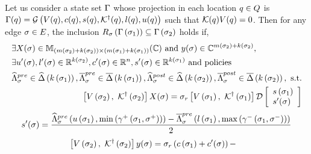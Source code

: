 \begin{lemma}
  Let us consider a state set $\Gamma$ whose projection in each
  location $q\in Q$ is $\Gamma(q) =
  \mathcal{G}\left(V(q),c(q),s(q),\mathcal{K}^\dagger(q),l(q),u(q)\right)$
  such that $\mathcal{K}(q)V(q) = 0$.  Then for any edge
  $\sigma\in E$, the inclusion
  $R_{\sigma}\left(\Gamma\left(\sigma_{1}\right)\right)
  \subseteq \Gamma\left(\sigma_{2}\right)$ holds if,
\begin{align}
\begin{split}
& \exists X(\sigma)\in
\mathbb{M}_{\left(m\left(\sigma_{2}\right)+k\left(\sigma_{2}\right)\right)\times \left(m\left(\sigma_{1}\right)+k\left(\sigma_{1}\right)\right)}(\mathbb{\mathbb{C}})~\text{and}~y(\sigma)\in
\mathbb{C}^{m\left(\sigma_{2}\right)+k\left(\sigma_{2}\right)},\\
& \exists u^\prime(\sigma),l^\prime(\sigma)\in \mathbb{R}^{k\left(\sigma_{2}\right)}, c^\prime(\sigma)\in\mathbb{R}^n,s^\prime(\sigma)\in\mathbb{R}^{k\left(\sigma_{1}\right)}~\text{and policies}\\
&\widehat{\Lambda}_{\sigma}^{pre}\in\widehat{\Delta}\left(k\left(\sigma_{1}\right)\right),\overline{\Lambda}_{\sigma}^{pre}\in\overline{\Delta}\left(k\left(\sigma_{1}\right)\right),
\widehat{\Lambda}_{\sigma}^{post}\in\widehat{\Delta}\left(k\left(\sigma_{2}\right)\right),\overline{\Lambda}_{\sigma}^{post}\in\overline{\Delta}\left(k\left(\sigma_{2}\right)\right),~\text{s.t.}
\end{split}\\
\begin{split}
& \left[V\left(\sigma_{2}\right),~\mathcal{K}^\dagger\left(\sigma_{2}\right)\right]X(\sigma) = \sigma_r\left[V\left(\sigma_{1}\right),~\mathcal{K}^\dagger\left(\sigma_{1}\right)\right]\mathcal{D}
\left[\begin{array}{l}{s\left(\sigma_{1}\right)}\\{s^\prime(\sigma)} \end{array}\right]\\
\end{split}
\end{align}
\begin{align}
\begin{split}
s^\prime(\sigma) = \frac{\widehat{\Lambda}_{\sigma}^{pre}\left(u\left(\sigma_{1}\right),\min\left(\gamma^+\left(\sigma_{1},\sigma^+\right)\right)\right)-
\overline{\Lambda}_{\sigma}^{pre}\left(l\left(\sigma_{1}\right),\max\left(\gamma^-\left(\sigma_{1},\sigma^-\right)\right)\right)}{2}\\
\end{split}
\end{align}
\begin{align}
\begin{split}
& \lt[V\lt(\postloc{\edge}\rt),~\pinv{\ptemplate}\lt(\postloc{\edge}\rt)\rt]y(\edge) = \reset{\edge}\lt(c\lt(\preloc{\edge}\rt)+c^\pr(\edge)\rt)- 

\end{split}
\end{align}
\end{lemma}
